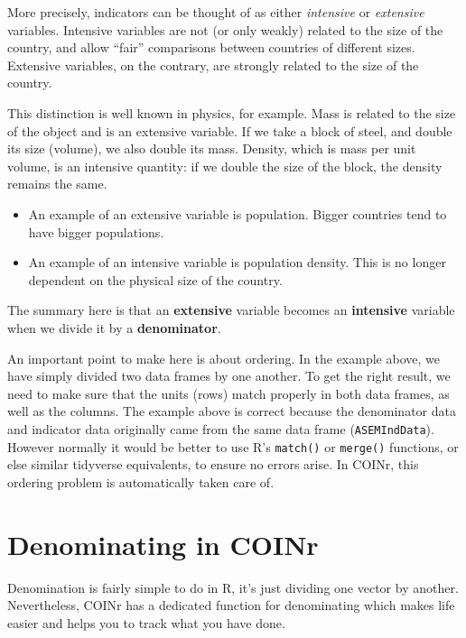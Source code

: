 \documentclass[
]{book}
\providecommand{\tightlist}{%
  \setlength{\itemsep}{0pt}\setlength{\parskip}{0pt}}
\begin{document}
More precisely, indicators can be thought of as either \emph{intensive} or \emph{extensive} variables. Intensive variables are not (or only weakly) related to the size of the country, and allow ``fair'' comparisons between countries of different sizes. Extensive variables, on the contrary, are strongly related to the size of the country.

This distinction is well known in physics, for example. Mass is related to the size of the object and is an extensive variable. If we take a block of steel, and double its size (volume), we also double its mass. Density, which is mass per unit volume, is an intensive quantity: if we double the size of the block, the density remains the same.

\begin{itemize}
\tightlist
\item
  An example of an extensive variable is population. Bigger countries tend to have bigger populations.
\item
  An example of an intensive variable is population density. This is no longer dependent on the physical size of the country.
\end{itemize}

The summary here is that an \textbf{extensive} variable becomes an \textbf{intensive} variable when we divide it by a \textbf{denominator}.

An important point to make here is about ordering. In the example above, we have simply divided two data frames by one another. To get the right result, we need to make sure that the units (rows) match properly in both data frames, as well as the columns. The example above is correct because the denominator data and indicator data originally came from the same data frame (\texttt{ASEMIndData}). However normally it would be better to use R's \texttt{match()} or \texttt{merge()} functions, or else similar tidyverse equivalents, to ensure no errors arise. In COINr, this ordering problem is automatically taken care of.

\hypertarget{denominating-in-coinr}{%
\section{Denominating in COINr}\label{denominating-in-coinr}}

Denomination is fairly simple to do in R, it's just dividing one vector by another. Nevertheless, COINr has a dedicated function for denominating which makes life easier and helps you to track what you have done.
\end{document}

